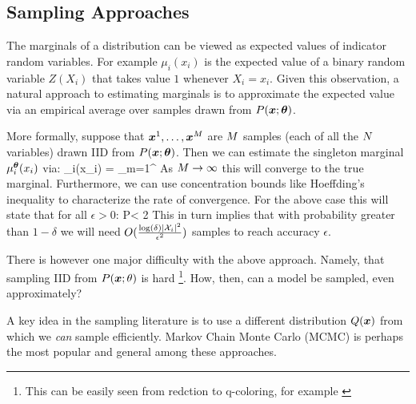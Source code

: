 \subsection{Sampling Approaches}
\label{sec:sampling}
The marginals of a distribution can be viewed as expected values of indicator random variables. For example $\mu_i(x_i)$ is the expected value of a binary
random variable $Z(X_i)$ that takes value $1$ whenever $X_i=x_i$. Given this observation, a natural approach to estimating marginals is to approximate the expected value via an empirical average over samples drawn from $P(\boldsymbol{x};\boldsymbol{\theta})$. 

More formally, suppose that $\boldsymbol{x}^{1},\ldots,\boldsymbol{x}^{M}$ are $M$ samples (each of all the $N$ variables) drawn IID from $P(\boldsymbol{x};\boldsymbol{\theta})$. Then we can estimate the singleton marginal $\mu^{\boldsymbol{\theta}}_i(x_i)$ via:
\be
\hat{\mu}_i(x_i) = \sum_{m=1}^{\nsamples} 
\ee
As $M \to \infty$ this will converge to the true marginal. Furthermore, we can use concentration bounds like Hoeffding's inequality to characterize the rate of convergence. For the above case this will state that for all $\epsilon > 0$:
\be
P < 2
\ee
This in turn implies that with probability greater than $1-\delta$ we will need $O(\frac{\log(\delta) |{\cal X}_i|^2}{\epsilon^2})$ samples to reach accuracy $\epsilon$.

There is however one major difficulty with the above approach.
Namely, that sampling IID from $P(\boldsymbol{x};\theta)$ is hard \footnote{This can be easily seen from redction to q-coloring, for example \cite{levin2009markov, bordewich2016mixing}}.
How, then, can a model be sampled, even approximately?

A key idea in the sampling literature is to use a different distribution $Q(\boldsymbol{x})$ from which we {\em can} sample efficiently. 
Markov Chain Monte Carlo (MCMC) is perhaps the most popular and general among these approaches\cite{andrieu2003introduction,levin2009markov}.


